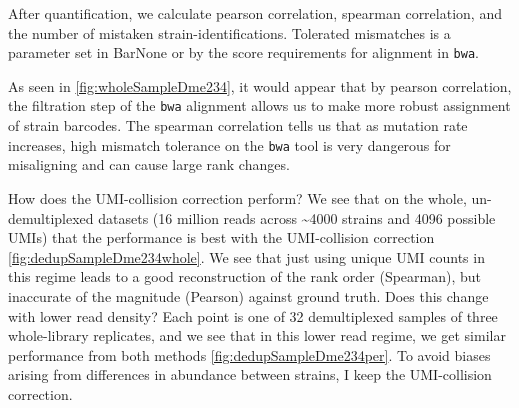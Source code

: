 After quantification, we calculate pearson correlation, spearman
correlation, and the number of mistaken strain-identifications.
Tolerated mismatches is a parameter set in BarNone or by the score
requirements for alignment in \texttt{bwa}.

As seen in \autoref{fig:wholeSampleDme234}, 
it would appear that by pearson correlation, the filtration step of the
\texttt{bwa} alignment allows us to make more robust assignment of
strain barcodes. The spearman correlation tells us that as mutation rate
increases, high mismatch tolerance on the \texttt{bwa} tool is very
dangerous for misaligning and can cause large rank changes.


How does the UMI-collision correction perform?
We see that on the whole, un-demultiplexed datasets (16 million reads
across \textasciitilde{}4000 strains and 4096 possible UMIs) that the
performance is best with the UMI-collision correction 
\autoref{fig:dedupSampleDme234whole}. We see that just
using unique UMI counts in this regime leads to a good reconstruction of
the rank order (Spearman), but inaccurate of the magnitude (Pearson)
against ground truth.
Does this change with lower read density? 
Each point is one of 32 demultiplexed samples of three whole-library
replicates, and we see that in this lower read regime, we get similar
performance from both methods \autoref{fig:dedupSampleDme234per}.
To avoid biases arising from differences in abundance between strains,
I keep the UMI-collision correction.



